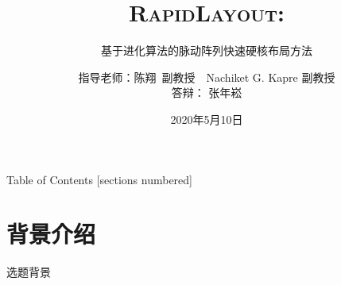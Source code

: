\documentclass[10pt]{beamer}
\title{\textsc{RapidLayout}:}
\subtitle{基于进化算法的脉动阵列快速硬核布局方法}
\date{2020年5月10日}
\author{指导老师：陈翔\ 副教授\ \ Nachiket G. Kapre 副教授 \\ 答辩：\hspace{0.55cm} 张年崧}
\institute{中山大学 电子与信息工程学院 通信工程专业}
\begin{document}
\maketitle

\begin{frame}{Table of Contents}
  [sections numbered]
  \tableofcontents[hideallsubsections]
\end{frame}


\section{背景介绍}

\begin{frame}{选题背景}


\end{frame}
\end{document}
